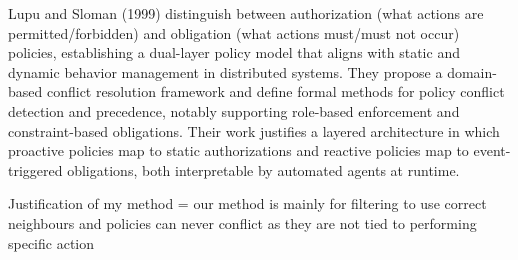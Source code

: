 Lupu and Sloman (1999) distinguish between authorization (what actions are permitted/forbidden) and obligation (what actions must/must not occur) policies, establishing a dual-layer policy model that aligns with static and dynamic behavior management in distributed systems. They propose a domain-based conflict resolution framework and define formal methods for policy conflict detection and precedence, notably supporting role-based enforcement and constraint-based obligations. Their work justifies a layered architecture in which proactive policies map to static authorizations and reactive policies map to event-triggered obligations, both interpretable by automated agents at runtime.


Justification of my method = our method is mainly for filtering to use correct neighbours and policies can never conflict as they are not tied to performing specific action




\cite{damianou2001ponder}


















